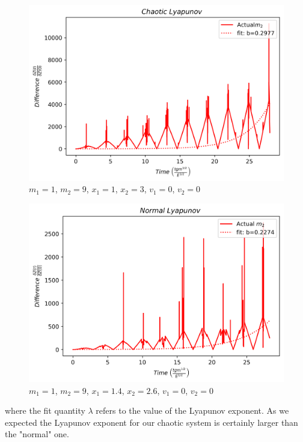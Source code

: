 \documentclass[twocolumn]{article}
\begin{document}
\begin{figure}[H]
\caption{$m_1=1$, $m_2=9$, $x_1=1$, $x_2=3$, $v_1=0$, $v_2=0$}
\centering
\includegraphics[scale=.45]{ChaoticLyapunov1}
\end{figure}
\begin{figure}[H]
\caption{$m_1=1$, $m_2=9$, $x_1=1.4$, $x_2=2.6$, $v_1=0$, $v_2=0$}
\centering
\includegraphics[scale=.45]{NormalLyapunov1}
\end{figure}
\hspace{-3.8mm}where the fit quantity $\lambda$ refers to the value of the Lyapunov exponent. As we expected the Lyapunov exponent for our chaotic system is certainly larger than the "normal" one.
\end{document}

